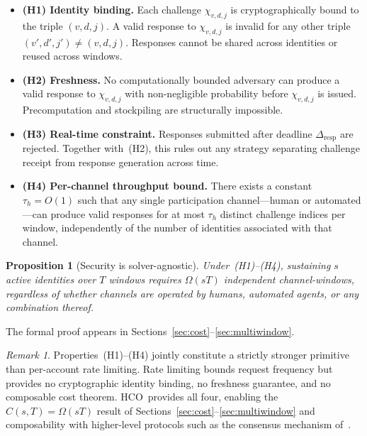 \documentclass[11pt]{article}
\newcommand{\HCO}{HCO\xspace}
\newtheorem{proposition}{Proposition}
\theoremstyle{remark}
\newtheorem{remark}{Remark}
\theoremstyle{plain}
\begin{document}
	\begin{itemize}
		\item \textbf{(H1) Identity binding.} Each challenge $\chi_{v,d,j}$
		is cryptographically bound to the triple $(v,d,j)$. A valid response
		to $\chi_{v,d,j}$ is invalid for any other triple
		$(v',d',j') \neq (v,d,j)$. Responses cannot be shared across
		identities or reused across windows.
		
		\item \textbf{(H2) Freshness.} No computationally bounded adversary
		can produce a valid response to $\chi_{v,d,j}$ with non-negligible
		probability before $\chi_{v,d,j}$ is issued. Precomputation and
		stockpiling are structurally impossible.
		
		\item \textbf{(H3) Real-time constraint.} Responses submitted after
		deadline $\Delta_{\mathrm{resp}}$ are rejected. Together with~(H2),
		this rules out any strategy separating challenge receipt from response
		generation across time.
		
		\item \textbf{(H4) Per-channel throughput bound.} There exists a
		constant $\tau_h = O(1)$ such that any single participation
		channel---human or automated---can produce valid responses for at most
		$\tau_h$ distinct challenge indices per window, independently of the
		number of identities associated with that channel.
	\end{itemize}
	
	\begin{proposition}[Security is solver-agnostic]
		\label{prop:agnostic}
		Under~(H1)--(H4), sustaining $s$ active identities over $T$ windows
		requires $\Omega(sT)$ independent channel-windows, regardless of
		whether channels are operated by humans, automated agents, or any
		combination thereof.
	\end{proposition}
	
	The formal proof appears in Sections~\ref{sec:cost}--\ref{sec:multiwindow}.
	
	
	\begin{remark}
		Properties~(H1)--(H4) jointly constitute a strictly stronger primitive
		than per-account rate limiting. Rate limiting bounds request frequency
		but provides no cryptographic identity binding, no freshness guarantee,
		and no composable cost theorem. \HCO\ provides all four, enabling the
		$C(s,T) = \Omega(sT)$ result of
		Sections~\ref{sec:cost}--\ref{sec:multiwindow} and composability with
		higher-level protocols such as the consensus mechanism
		of~\cite{maleki2026pocmt}.
	\end{remark}
	
\end{document}
